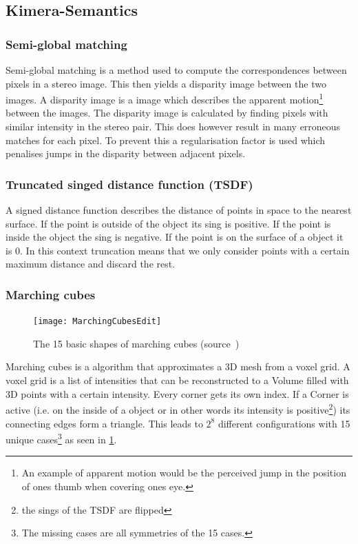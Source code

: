 \documentclass[11pt,a4paper]{article}
\begin{document}
\subsection{Kimera-Semantics}
\subsubsection{Semi-global matching} \label{pre:semi-global matching}
Semi-global matching is a method used  to compute the correspondences between pixels in a stereo image. 
This then yields a disparity image between the two images. 
A disparity image is a image which describes the apparent motion\footnote{An example of apparent motion would be the perceived jump in the position of ones thumb when covering ones eye.} between the images.
The disparity image is calculated by finding pixels with similar intensity in the stereo pair. 
This does however result in many erroneous matches for each pixel. 
To prevent this a regularisation factor is used which penalises jumps in the disparity between adjacent pixels.
\subsubsection{Truncated singed distance function (TSDF)} \label{pre:TSDF}
A signed distance function describes the distance of points in space to the nearest surface.
If the point is outside of the object its sing is positive.
If the point is inside the object the sing is negative. 
If the point is on the surface of a object it is 0. 
In this context truncation means that we only consider points with a certain maximum distance and discard the rest. 
\subsubsection{Marching cubes} \label{pre:marching cubes} 
\begin{figure}
  \centering
  \texttt{[image: MarchingCubesEdit]}
  \caption{The 15 basic shapes of marching cubes (source~\cite{marchingCubesImage})}\label{Fig:Marching cubes}  
\end{figure}
Marching cubes is a algorithm that approximates a 3D mesh from a voxel grid. 
A voxel grid is a list of intensities that can be reconstructed to a Volume filled with 3D points with a certain intensity. 
Every corner gets its own index.
If a Corner is active (i.e. on the inside of a object or in other words its intensity is positive\footnote{the sings of the TSDF are flipped}) its connecting edges form a triangle. 
This leads to $2^8$ different configurations with 15 unique cases\footnote{The missing cases are all symmetries of the 15 cases.} as seen in \ref{Fig:Marching cubes}.
\end{document}
